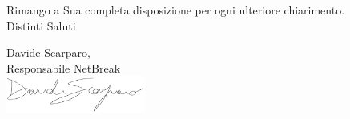 \documentclass[11pt,a4paper]{letter}
\begin{document}
\begin{letter}
\noindent Rimango a Sua completa disposizione per ogni ulteriore chiarimento.\\
Distinti Saluti
	

\closing{Davide Scarparo,\\ Responsabile NetBreak\\ \includegraphics[width=1.8in]{DS.png}}


\end{letter}
\end{document}
